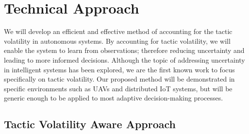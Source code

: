 \documentclass{article}
\begin{document}








\section{Technical Approach}



 
We will develop an efficient and effective method of accounting for the tactic volatility in autonomous systems. By accounting for tactic volatility, we will enable the system to learn from observations; therefore reducing uncertainty and leading to more informed decisions. Although the topic of addressing uncertainty in intelligent systems has been explored, we are the first known work to focus specifically on tactic volatility. Our proposed method will be demonstrated in specific environments such as UAVs and distributed IoT systems, but will be generic enough to be applied to most adaptive decision-making processes. 



\subsection{Tactic Volatility Aware Approach} %
\end{document}
